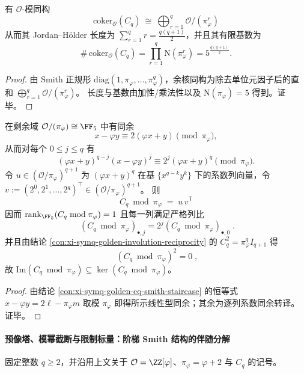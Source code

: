 \begin{corollary}\label{cor:xi-symq-golden-cq-cokernel-structure}
有 \(\mathcal O\)-模同构
\[
\boxed{\;
\mathrm{coker}_{\mathcal O}(C_q)\ \cong\ \bigoplus_{r=1}^{q}\mathcal O/(\pi_\varphi^{r})\;}
\]
从而其 Jordan--H\"older 长度为 \(\sum_{r=1}^{q}r=\frac{q(q+1)}{2}\)，并且其有限基数为
\[
\boxed{\;
\#\,\mathrm{coker}_{\mathcal O}(C_q)=\prod_{r=1}^{q}\mathrm N(\pi_\varphi^{r})=5^{\frac{q(q+1)}{2}}.\;}
\]
\end{corollary}
\begin{proof}
由 Smith 正规形 \(\mathrm{diag}(1,\pi_\varphi,\dots,\pi_\varphi^{q})\)，余核同构为除去单位元因子后的直和 \(\bigoplus_{r=1}^q\mathcal O/(\pi_\varphi^r)\)。
长度与基数由加性/乘法性以及 \(\mathrm N(\pi_\varphi)=5\) 得到。证毕。
\end{proof}

\begin{corollary}\label{cor:xi-symq-golden-cq-mod-pi-rankone-outer}
在剩余域 \(\mathcal O/(\pi_\varphi)\cong\FF_5\) 中有同余
\[
x-\varphi y\equiv 2(\varphi x+y)\pmod{\pi_\varphi},
\]
从而对每个 \(0\le j\le q\) 有
\[
(\varphi x+y)^{q-j}(x-\varphi y)^j\equiv 2^{j}(\varphi x+y)^q\pmod{\pi_\varphi}.
\]
令 \(u\in(\mathcal O/\pi_\varphi)^{q+1}\) 为 \((\varphi x+y)^q\) 在基 \(\{x^{q-k}y^k\}\) 下的系数列向量，令
\(
v:=(2^{0},2^{1},\dots,2^{q})^{\top}\in(\mathcal O/\pi_\varphi)^{q+1}
\)。
则
\[
\boxed{\;
C_q\bmod \pi_\varphi\;=\;u\,v^{\mathsf T}\;}
\]
因而 \(\mathrm{rank}_{\FF_5}(C_q\bmod \pi_\varphi)=1\) 且每一列满足严格列比
\[
\boxed{\;
(C_q\bmod \pi_\varphi)_{\bullet,j}=2^{j}(C_q\bmod \pi_\varphi)_{\bullet,0}\; }.
\]
并且由结论 \ref{con:xi-symq-golden-involution-reciprocity} 的 \(C_q^2=\pi_\varphi^q I_{q+1}\) 得
\[
\boxed{\;(C_q\bmod \pi_\varphi)^2=0\;},
\]
故 \(\mathrm{Im}(C_q\bmod \pi_\varphi)\subseteq \ker(C_q\bmod \pi_\varphi)\)。
\end{corollary}
\begin{proof}
由结论 \ref{con:xi-symq-golden-cq-smith-staircase} 的恒等式 \(x-\varphi y=2\ell-\pi_\varphi m\) 取模 \(\pi_\varphi\) 即得所示线性型同余；其余为逐列系数同余转译。证毕。
\end{proof}

\paragraph{预像塔、模幂截断与限制标量：阶梯 Smith 结构的伴随分解}
固定整数 \(q\ge 2\)，并沿用上文关于 \(\mathcal O=\ZZ[\varphi]\)、\(\pi_\varphi=\varphi+2\) 与 \(C_q\) 的记号。

